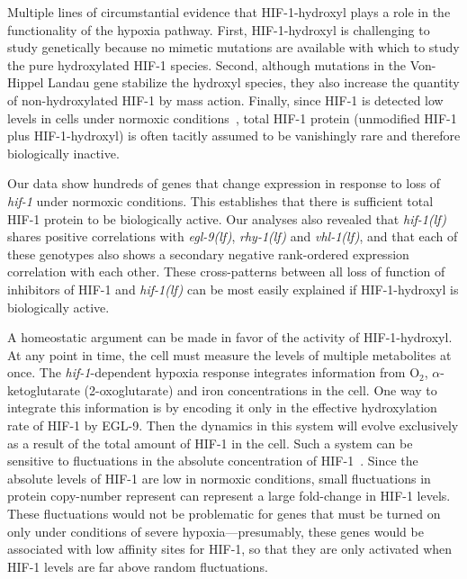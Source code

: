 \documentclass[10pt, onecolumn]{article}
\newcommand{\gene}[1]{\emph{#1}}
\newcommand{\egl}{\emph{\mbox{egl-9}(lf)}}
\newcommand{\rhy}{\emph{\mbox{rhy-1}(lf)}}
\newcommand{\vhl}{\emph{\mbox{vhl-1}(lf)}}
\newcommand{\hif}{\emph{\mbox{hif-1(lf)}}}
\newcommand{\eglp}{EGL-9}
\newcommand{\hifp}{HIF-1}
\begin{document}
Multiple lines of circumstantial evidence that \hifp{}-hydroxyl plays a role
in the functionality of the hypoxia pathway. First, \hifp{}-hydroxyl is
challenging to study genetically because no mimetic mutations are available with
which to study the pure hydroxylated \hifp{} species. Second, although mutations in
the Von-Hippel Landau gene stabilize the hydroxyl species, they also increase the
quantity of non-hydroxylated \hifp{} by mass action.
Finally, since \hifp{} is detected low levels
in cells under normoxic conditions~\cite{Wang1993}, total \hifp{} protein
(unmodified \hifp{} plus \hifp{}-hydroxyl) is often tacitly assumed to be
vanishingly rare and therefore biologically inactive.

Our data show hundreds of genes that change expression in response
to loss of \gene{hif-1} under normoxic conditions. This establishes that there is
sufficient total \hifp{} protein to be biologically active.
Our analyses also revealed that \hif{} shares
positive correlations with \egl{}, \rhy{} and \vhl{}, and that each of these genotypes
also shows a secondary negative rank-ordered expression correlation with each other.
These cross-patterns between all loss of function of inhibitors of \hifp{} and
\hif{} can be most easily explained if \hifp{}-hydroxyl is biologically active.

A homeostatic argument can be made in favor of the activity of \hifp{}-hydroxyl.
At any point in time, the cell must measure the levels of
multiple metabolites at once. The \gene{hif-1}-dependent hypoxia
response integrates information from O$_2$, $\alpha$-ketoglutarate
(2-oxoglutarate) and iron concentrations in the cell. One way to
integrate this information is by encoding it only in the effective hydroxylation
rate of \hifp{} by \eglp{}. Then the dynamics in this system will evolve
exclusively as a result of the total amount of \hifp{} in the cell. Such a system
can be sensitive to fluctuations in the absolute concentration of
\hifp{}~\cite{Goentoro2009a}. Since the absolute levels of \hifp{} are low in
normoxic conditions, small fluctuations in protein copy-number represent can
represent a large fold-change in \hifp{} levels. These fluctuations would
not be problematic for genes that must be turned on only under conditions of severe
hypoxia---presumably, these genes would be associated with low affinity
sites for \hifp{}, so that they are only activated when \hifp{} levels are far
above random fluctuations.
\end{document}
